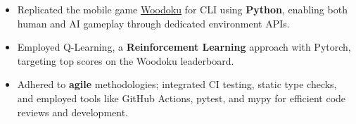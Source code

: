 \documentclass[10pt,a4paper,ragged2e,withhyper]{altacv}
\begin{document}
\begin{paracol}{2}
    





\begin{itemize}

    \item Replicated the mobile game \href{https://play.google.com/store/apps/details?id=com.tripledot.woodoku&hl=en_CA&gl=US}{Woodoku} for CLI using \textbf{Python}, enabling both human and AI gameplay through dedicated environment APIs.
    \item Employed Q-Learning, a \textbf{Reinforcement Learning} approach with Pytorch, targeting top scores on the Woodoku leaderboard.
    \item Adhered to \textbf{agile} methodologies; integrated CI testing, static type checks, and employed tools like GitHub Actions, pytest, and mypy for efficient code reviews and development.

\end{itemize}




\end{paracol}
\end{document}
